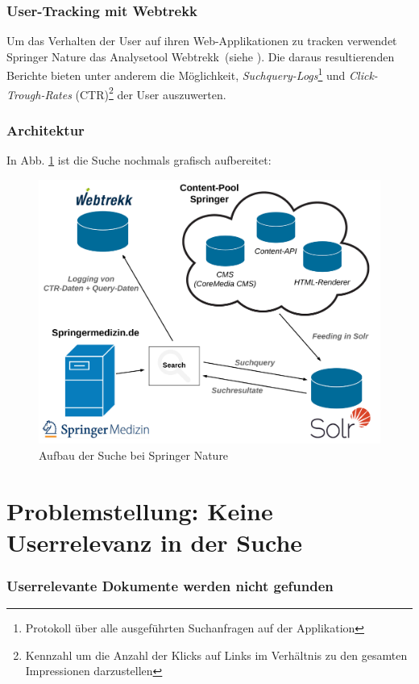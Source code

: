\subsubsection{User-Tracking mit Webtrekk}
\label{sec:Einfuehrung:AufbauSucheBeiSpringerNature:Webtrekk}

Um das Verhalten der User auf ihren Web-Applikationen zu tracken verwendet Springer Nature das Analysetool Webtrekk~(siehe \cite{webtrekk}). Die daraus resultierenden Berichte bieten unter anderem die Möglichkeit, \textit{Suchquery-Logs}\footnote{Protokoll über alle ausgeführten Suchanfragen auf der Applikation} und \textit{Click-Trough-Rates} (CTR)\footnote{Kennzahl um die Anzahl der Klicks auf Links im Verhältnis zu den gesamten Impressionen darzustellen} der User auszuwerten.

\pagebreak

\subsubsection{Architektur}
\label{sec:Einfuehrung:AufbauSucheBeiSpringerNature:Architektur}

In Abb. \ref{fig:SucheSpringerNature} ist die Suche nochmals grafisch aufbereitet:

\begin{figure}[H]
\centering
\includegraphics[width=0.5\linewidth]{gfx/AufbauSucheSpringerNature}
\caption[Aufbau der Suche bei Springer Nature]{Aufbau der Suche bei Springer Nature}
\label{fig:SucheSpringerNature}
\end{figure}

\section{Problemstellung: Keine Userrelevanz in der Suche}
\label{sec:Einfuehrung:Problemstellung}

\subsubsection{Userrelevante Dokumente werden nicht gefunden}
\label{sec:Einfuehrung:Problemstellung:Userrelevanz}

